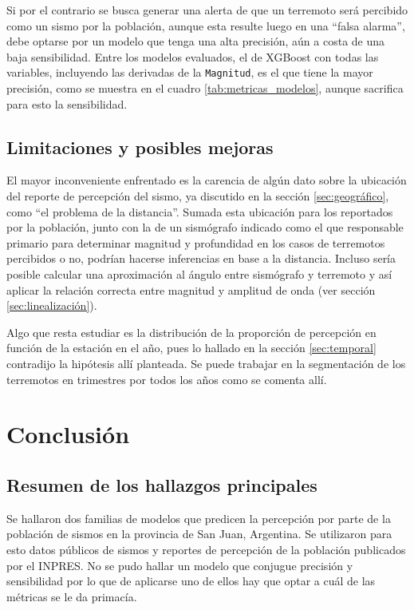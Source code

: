 \documentclass[a4paper]{report}
\begin{document}
Si por el contrario se busca generar una alerta de que un terremoto será percibido como un sismo por la población, aunque esta resulte luego en una ``falsa alarma'', debe optarse por un modelo que tenga una alta precisión, aún a costa de una baja sensibilidad.
Entre los modelos evaluados, el de XGBoost con todas las variables, incluyendo las derivadas de la \verb'Magnitud', es el que tiene la mayor precisión, como se muestra en el cuadro \ref{tab:metricas_modelos}, aunque sacrifica para esto la sensibilidad.




\section{Limitaciones y posibles mejoras}
El mayor inconveniente enfrentado es la carencia de algún dato sobre la ubicación del reporte de percepción del sismo, ya discutido en la sección \ref{sec:geográfico}, como ``el problema de la distancia''.
Sumada esta ubicación para los reportados por la población, junto con la de un sismógrafo indicado como el que responsable primario para determinar magnitud y profundidad en los casos de terremotos percibidos o no, podrían hacerse inferencias en base a la distancia.
Incluso sería posible calcular una aproximación al ángulo entre sismógrafo y terremoto y así aplicar la relación correcta entre magnitud y amplitud de onda (ver sección \ref{sec:linealización}).

Algo que resta estudiar es la distribución de la proporción de percepción en función de la estación en el año, pues lo hallado en la sección \ref{sec:temporal} contradijo la hipótesis allí planteada.
Se puede trabajar en la segmentación de los terremotos en trimestres por todos los años como se comenta allí. 



\chapter{Conclusión}

\section{Resumen de los hallazgos principales}
Se hallaron dos familias de modelos que predicen la percepción por parte de la población de sismos en la provincia de San Juan, Argentina.
Se utilizaron para esto datos públicos de sismos y reportes de percepción de la población publicados por el INPRES.
No se pudo hallar un modelo que conjugue precisión y sensibilidad por lo que de aplicarse uno de ellos hay que optar a cuál de las métricas se le da primacía.
\end{document}
